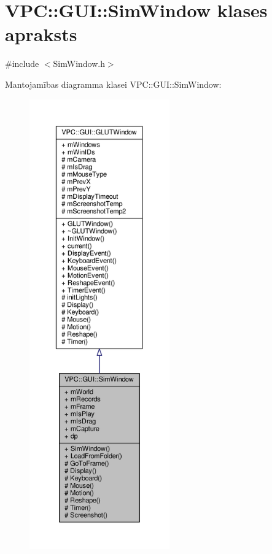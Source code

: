 \hypertarget{class_v_p_c_1_1_g_u_i_1_1_sim_window}{}\section{V\+PC\+:\+:G\+UI\+:\+:Sim\+Window klases apraksts}
\label{class_v_p_c_1_1_g_u_i_1_1_sim_window}


{\ttfamily \#include $<$Sim\+Window.\+h$>$}



Mantojamības diagramma klasei V\+PC\+:\+:G\+UI\+:\+:Sim\+Window\+:
\nopagebreak
\begin{figure}[H]
\begin{center}
\leavevmode
\includegraphics[height=550pt]{class_v_p_c_1_1_g_u_i_1_1_sim_window__inherit__graph}
\end{center}
\end{figure}


